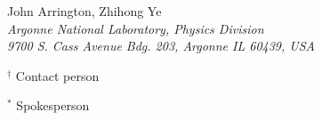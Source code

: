 \documentclass{article}
\begin{document}
\begin{center}
\vspace*{15pt}

John Arrington, Zhihong Ye\\
\vspace*{5pt}
{\it Argonne National Laboratory, Physics Division \\9700 S. Cass Avenue Bdg. 203, Argonne IL 60439, USA}


\vspace*{20pt}


\end{center}

$^\dagger$ Contact person 

$^\ast$ Spokesperson

\vfill\eject

\clearpage




\newpage

\tableofcontents

\newpage

\end{document}

